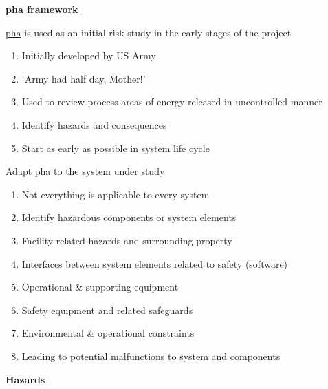 \documentclass[aspectratio=1610,pdftex,dvipsnames,compress,xcolor={dvipsnames}]{beamer}
\newcommand{\acs}{\acrshort} %
\begin{document}
\begin{frame}[plain]{}
    \centering\LARGE\textbf{\acs{pha} framework}
\end{frame}


\addtocounter{framenumber}{-1}
\begin{frame}{\href{https://uidaho.pressbooks.pub/riskassessment/chapter/preliminary-hazards-analysis/}{\acs{pha}} is used as an initial risk study in the early stages of the project}
    \begin{enumerate}[series=outerlist,topsep=0pt,itemsep=21pt,leftmargin=*,label=(\arabic*)]
        \item[]Initially developed by US Army
        \item[]`Army had half day, Mother!'
        \item[]Used to review process areas of energy released in uncontrolled manner
        \item[]Identify hazards and consequences
        \item[]Start as early as possible in system life cycle
    \end{enumerate}
\end{frame}


\begin{frame}{Adapt \acs{pha} to the system under study}
    \begin{enumerate}[series=outerlist,topsep=0pt,itemsep=7pt,leftmargin=*,label=(\arabic*)]
        \item[]Not everything is applicable to every system
        \item[]Identify hazardous components or system elements
        \item[]Facility related hazards and surrounding property
        \item[]Interfaces between system elements related to safety (software)
        \item[]Operational \& supporting equipment  
        \item[]Safety equipment and related safeguards
        \item[]Environmental \& operational constraints  
        \item[]Leading to potential malfunctions to system and components
    \end{enumerate}
\end{frame}


\begin{frame}[plain]{}
    \centering\LARGE\textbf{Hazards}
\end{frame}
\end{document}
